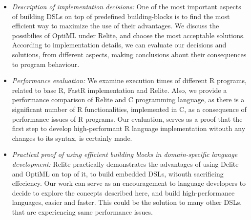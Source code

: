 \documentclass{sigplanconf}
\begin{document}
\begin{itemize}
\itemsep10pt
  \item \textit{Description of implementation decisions:} One of the most important aspects of building DSLs on top of predefined building-blocks is to find the
							    most efficient way to maximize the use of their advantages. We discuss the possibilies of OptiML under Relite,
							    and choose the most acceptable solutions.  According to implementation details, we can evaluate our decisions and solutions,
							    from different aspects, making conclusions about their consequences to program behaviour. 
  \item \textit{Performance evaluation:} We examine execution times of different R programs, related to base R, FastR implementation and Relite. Also, we provide a performance 
					  comparison of Relite and C programming language, as there is a significant number of R functionalities, implemented in C, as a consequence
					  of performance issues of R programs. Our evaluation, serves as a proof that the first step to develop high-performant R language implementation
					  witouth any changes to its syntax, is certainly made.
  \item \textit{Practical proof of using efficient building blocks in domain-specific language development:} Relite practically demonstrates the advantages of using Delite and OptiML on top of it,
													       to build embedded DSLs, witouth sacrificing effeciency. Our work can serve as an encouragement to language 
													       developers to decide to explore the concepts described here, and build high-performance languages,
													       easier and faster. This could be the solution to many other DSLs, that are experiencing same performance issues.
  
\end{itemize}
\end{document}
